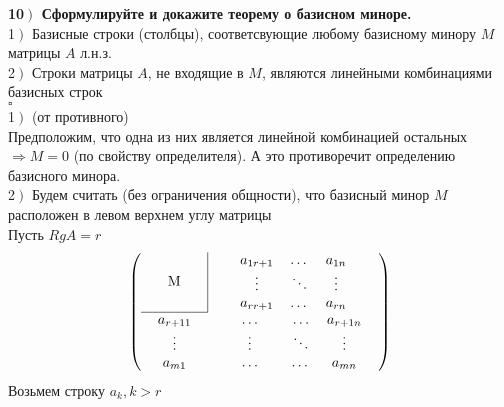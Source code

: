 \documentclass[a4paper,12pt]{article}
\begin{document}
    \textbf{10$\left.\right)$ Сформулируйте и докажите теорему о базисном миноре.}\\
    1$\left.\right)$ Базисные строки (столбцы), соответсвующие любому базисному минору $M$ матрицы $A$ л.н.з.\\
    2$\left.\right)$ Строки матрицы $A$, не входящие в $M$, являются линейными комбинациями базисных строк\\
    $\square$\\
    1$\left.\right)$ (от противного)\\
    Предположим, что одна из них является линейной комбинацией остальных $\Rightarrow M=0$ (по свойству определителя). А это противоречит определению базисного минора.\\
    2$\left.\right)$ Будем считать (без ограничения общности), что базисный минор $M$ расположен в левом верхнем углу матрицы\\
    Пусть $RgA=r$
    \[\left( \begin{tabular}{c|c}
                 M & \begin{tabular}{ccc}
                         $a_{1r+1}$ & \ldots   & $a_{1n}$ \\
                         $\vdots$   & $\ddots$ & $\vdots$ \\
                         $a_{rr+1}$ & \ldots   & $a_{rn}$
                 \end{tabular} \\ \cline{1-1}
                 \multicolumn{1}{c}{\begin{tabular}{c}
                                        $a_{r+11}$ \\
                                        $\vdots$   \\
                                        $a_{m1}$
                 \end{tabular}} & \multicolumn{1}{c}{\begin{tabular}{ccccc}
                                                         & $\ldots$ & & $\ldots$ & $a_{r+1n}$ \\
                                                         & $\vdots$ & & $\ddots$ & $\vdots$   \\
                                                         & $\ldots$ & & \ldots   & $a_{mn}$
                 \end{tabular}} \\
    \end{tabular}
    \right) \]
    Возьмем строку $a_k, k>r$\\
\end{document}
